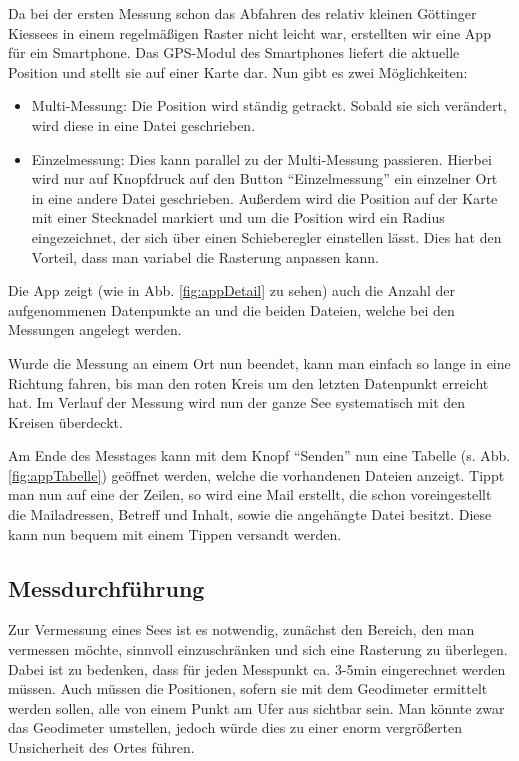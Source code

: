 \documentclass[12pt,a4paper,titlepage,headinclude,bibtotoc]{scrartcl}
\numberwithin{equation}{subsection}
\begin{document}
Da bei der ersten Messung schon das Abfahren des relativ kleinen Göttinger Kiessees in einem regelmäßigen Raster nicht leicht war, erstellten wir eine App für ein Smartphone.
Das GPS-Modul des Smartphones liefert die aktuelle Position und stellt sie auf einer Karte dar.
Nun gibt es zwei Möglichkeiten:
\begin{itemize}
	\item Multi-Messung: Die Position wird ständig getrackt.
		Sobald sie sich verändert, wird diese in eine Datei geschrieben.
	\item Einzelmessung: Dies kann parallel zu der Multi-Messung passieren.
		Hierbei wird nur auf Knopfdruck auf den Button "`Einzelmessung"' ein einzelner Ort in eine andere Datei geschrieben.
		Außerdem wird die Position auf der Karte mit einer Stecknadel markiert und um die Position wird ein Radius eingezeichnet, der sich über einen Schieberegler einstellen lässt.
		Dies hat den Vorteil, dass man variabel die Rasterung anpassen kann.
\end{itemize}

Die App zeigt (wie in Abb. \ref{fig:appDetail} zu sehen) auch die Anzahl der aufgenommenen Datenpunkte an und die beiden Dateien, welche bei den Messungen angelegt werden.

Wurde die Messung an einem Ort nun beendet, kann man einfach so lange in eine Richtung fahren, bis man den roten Kreis um den letzten Datenpunkt erreicht hat.
Im Verlauf der Messung wird nun der ganze See systematisch mit den Kreisen überdeckt.

Am Ende des Messtages kann mit dem Knopf "`Senden"' nun eine Tabelle (s. Abb. \ref{fig:appTabelle}) geöffnet werden, welche die vorhandenen Dateien anzeigt.
Tippt man nun auf eine der Zeilen, so wird eine Mail erstellt, die schon voreingestellt die Mailadressen, Betreff und Inhalt, sowie die angehängte Datei besitzt.
Diese kann nun bequem mit einem Tippen versandt werden.


\subsection{Messdurchführung}

Zur Vermessung eines Sees ist es notwendig, zunächst den Bereich, den man vermessen möchte, sinnvoll einzuschränken und sich eine Rasterung zu überlegen.
Dabei ist zu bedenken, dass für jeden Messpunkt ca. 3-5min eingerechnet werden müssen.
Auch müssen die Positionen, sofern sie mit dem Geodimeter ermittelt werden sollen, alle von einem Punkt am Ufer aus sichtbar sein.
Man könnte zwar das Geodimeter umstellen, jedoch würde dies zu einer enorm vergrößerten Unsicherheit des Ortes führen.
\end{document}
